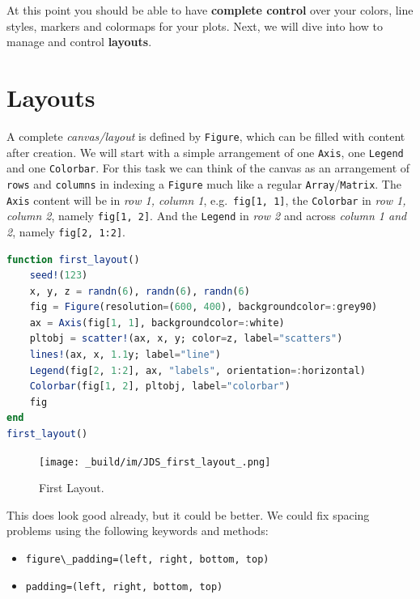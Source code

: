 \documentclass[
  notoc %
]{tufte-book}
\providecommand{\tightlist}{%
  \setlength{\itemsep}{0pt}\setlength{\parskip}{0pt}
}
\newcommand{\passthrough}[1]{#1}
\begin{document}
At this point you should be able to have \textbf{complete control} over
your colors, line styles, markers and colormaps for your plots. Next, we
will dive into how to manage and control \textbf{layouts}.

\hypertarget{sec:makie_layouts}{%
\section{Layouts}\label{sec:makie_layouts}}

A complete \emph{canvas/layout} is defined by
\passthrough{\lstinline!Figure!}, which can be filled with content after
creation. We will start with a simple arrangement of one
\passthrough{\lstinline!Axis!}, one \passthrough{\lstinline!Legend!} and
one \passthrough{\lstinline!Colorbar!}. For this task we can think of
the canvas as an arrangement of \passthrough{\lstinline!rows!} and
\passthrough{\lstinline!columns!} in indexing a
\passthrough{\lstinline!Figure!} much like a regular
\passthrough{\lstinline!Array!}/\passthrough{\lstinline!Matrix!}. The
\passthrough{\lstinline!Axis!} content will be in \emph{row 1, column
1}, e.g.~\passthrough{\lstinline!fig[1, 1]!}, the
\passthrough{\lstinline!Colorbar!} in \emph{row 1, column 2}, namely
\passthrough{\lstinline!fig[1, 2]!}. And the
\passthrough{\lstinline!Legend!} in \emph{row 2} and across \emph{column
1 and 2}, namely \passthrough{\lstinline!fig[2, 1:2]!}.

\begin{lstlisting}[language=Julia]
function first_layout()
    seed!(123)
    x, y, z = randn(6), randn(6), randn(6)
    fig = Figure(resolution=(600, 400), backgroundcolor=:grey90)
    ax = Axis(fig[1, 1], backgroundcolor=:white)
    pltobj = scatter!(ax, x, y; color=z, label="scatters")
    lines!(ax, x, 1.1y; label="line")
    Legend(fig[2, 1:2], ax, "labels", orientation=:horizontal)
    Colorbar(fig[1, 2], pltobj, label="colorbar")
    fig
end
first_layout()
\end{lstlisting}

\begin{figure}
\hypertarget{fig:first_layout}{%
\centering
\texttt{[image: \_build/im/JDS\_first\_layout\_.png]}
\caption{First Layout.}\label{fig:first_layout}
}
\end{figure}

This does look good already, but it could be better. We could fix
spacing problems using the following keywords and methods:

\begin{itemize}
\tightlist
\item
  \passthrough{\lstinline!figure\_padding=(left, right, bottom, top)!}
\item
  \passthrough{\lstinline!padding=(left, right, bottom, top)!}
\end{itemize}
\end{document}
